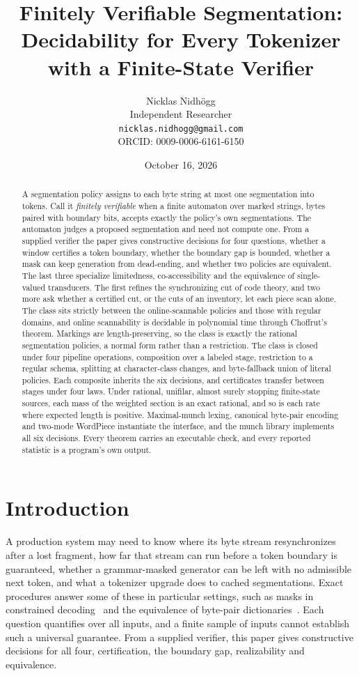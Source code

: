 \documentclass[11pt,a4paper]{article}
\title{Finitely Verifiable Segmentation:\\Decidability for Every Tokenizer with a Finite-State Verifier}
\author{Nicklas Nidh\"ogg\\[0.4em] \normalsize Independent Researcher\\ \normalsize
\texttt{nicklas.nidhogg@gmail.com}\\ \normalsize ORCID: 0009-0006-6161-6150}
\date{October 16, 2026}
\theoremstyle{definition}
\theoremstyle{plain}
\begin{document}
\maketitle

\begin{abstract}
A segmentation policy assigns to each byte string at most one segmentation into tokens. Call it
\emph{finitely verifiable} when a finite automaton over marked strings, bytes paired with boundary bits, accepts exactly
the policy's own segmentations. The automaton judges a proposed segmentation and need not compute one. From a supplied
verifier the paper gives constructive decisions for four questions, whether a window certifies a token boundary, whether
the boundary gap is bounded, whether a mask can keep generation from dead-ending, and whether two policies are
equivalent. The last three specialize limitedness, co-accessibility and the equivalence of single-valued transducers.
The first refines the synchronizing cut of code theory, and two more ask whether a certified cut, or the cuts of an
inventory, let each piece scan alone. The class sits strictly between the online-scannable policies and those with
regular domains, and online scannability is decidable in polynomial time through Choffrut's theorem. Markings are
length-preserving, so the class is exactly the rational segmentation policies, a normal form rather than a restriction.
The class is closed under four pipeline operations, composition over a labeled stage, restriction to a regular schema,
splitting at character-class changes, and byte-fallback union of literal policies. Each composite inherits the six
decisions, and certificates transfer between stages under four laws. Under rational, unifilar, almost surely stopping
finite-state sources, each mass of the weighted section is an exact rational, and so is each rate where expected length
is positive. Maximal-munch lexing, canonical byte-pair encoding and two-mode WordPiece instantiate the interface, and
the munch library implements all six decisions. Every theorem carries an executable check, and every reported statistic
is a program's own output.
\end{abstract}

\section{Introduction}

A production system may need to know where its byte stream resynchronizes after a lost fragment, how far that stream can
run before a token boundary is guaranteed, whether a grammar-masked generator can be left with no admissible next token,
and what a tokenizer upgrade does to cached segmentations. Exact procedures answer some of these in particular settings,
such as masks in constrained decoding~\citep{koo2024automata} and the equivalence of byte-pair
dictionaries~\citep{berglund2024bpedfa}. Each question quantifies over all inputs, and a finite sample of inputs cannot
establish such a universal guarantee. From a supplied verifier, this paper gives constructive decisions for all four,
certification, the boundary gap, realizability and equivalence.
\end{document}
